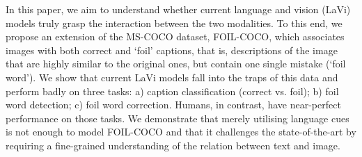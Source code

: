 In this paper, we aim to understand whether current language and vision (LaVi) models truly grasp the interaction between the two modalities. To this end, we propose an extension of the MS-COCO dataset, FOIL-COCO, which associates images with both correct and `foil' captions, that is, descriptions of the image that are highly similar to the original ones, but contain one single mistake (`foil word'). We show that current LaVi models fall into the traps of this data and perform badly on three tasks: a) caption  classification (correct vs. foil); b) foil word detection; c) foil word correction. Humans, in contrast, have near-perfect performance on those tasks. We demonstrate that merely utilising language cues is not enough to model FOIL-COCO and that it challenges the state-of-the-art by requiring a fine-grained understanding of the relation between text and image.
